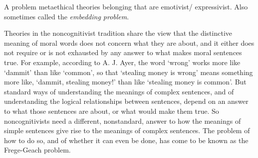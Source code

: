 A problem metaethical theories belonging that are emotivist/ expressivist. Also sometimes called the \textit{embedding problem}.

Theories in the noncognitivist tradition share the view that the distinctive meaning of moral words does not concern what they are about, and it either does not require or is not exhausted by any answer to what makes moral sentences true. For example, according to A. J. Ayer, the word `wrong' works more like `dammit' than like `common', so that `stealing money is wrong' means something more like, `dammit, stealing money!' than like `stealing money is common'. But standard ways of understanding the meanings of complex sentences, and of understanding the logical relationships between sentences, depend on an answer to what those sentences are about, or what would make them true. So noncognitivists need a different, nonstandard, answer to how the meanings of simple sentences give rise to the meanings of complex sentences. The problem of how to do so, and of whether it can even be done, has come to be known as the Frege-Geach problem.

